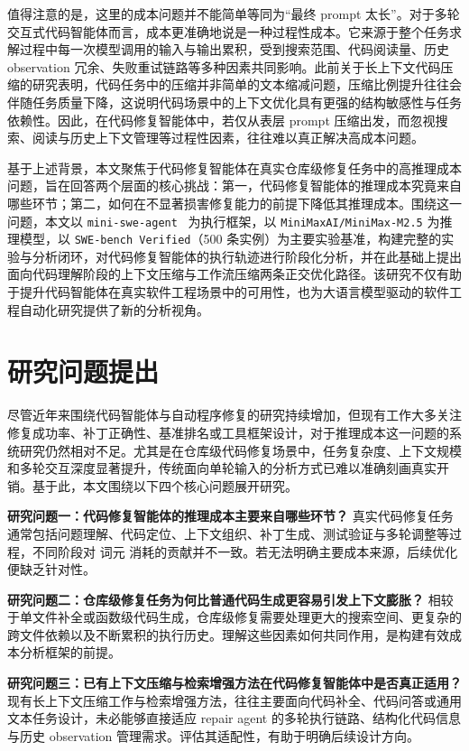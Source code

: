 值得注意的是，这里的成本问题并不能简单等同为“最终 prompt 太长”。对于多轮交互式代码智能体而言，成本更准确地说是一种过程性成本。它来源于整个任务求解过程中每一次模型调用的输入与输出累积，受到搜索范围、代码阅读量、历史 observation 冗余、失败重试链路等多种因素共同影响。此前关于长上下文代码压缩的研究表明，代码任务中的压缩并非简单的文本缩减问题，压缩比例提升往往会伴随任务质量下降，这说明代码场景中的上下文优化具有更强的结构敏感性与任务依赖性。因此，在代码修复智能体中，若仅从表层 prompt 压缩出发，而忽视搜索、阅读与历史上下文管理等过程性因素，往往难以真正解决高成本问题。

基于上述背景，本文聚焦于代码修复智能体在真实仓库级修复任务中的高推理成本问题，旨在回答两个层面的核心挑战：第一，代码修复智能体的推理成本究竟来自哪些环节；第二，如何在不显著损害修复能力的前提下降低其推理成本。围绕这一问题，本文以 \texttt{mini-swe-agent}~\cite{yang2024sweagent} 为执行框架，以 \texttt{MiniMaxAI/MiniMax-M2.5} 为推理模型，以 \texttt{SWE-bench Verified}（500 条实例）为主要实验基准，构建完整的实验与分析闭环，对代码修复智能体的执行轨迹进行阶段化分析，并在此基础上提出面向代码理解阶段的上下文压缩与工作流压缩两条正交优化路径。该研究不仅有助于提升代码智能体在真实软件工程场景中的可用性，也为大语言模型驱动的软件工程自动化研究提供了新的分析视角。


\section{研究问题提出}

尽管近年来围绕代码智能体与自动程序修复的研究持续增加，但现有工作大多关注修复成功率、补丁正确性、基准排名或工具框架设计，对于推理成本这一问题的系统研究仍然相对不足。尤其是在仓库级代码修复场景中，任务复杂度、上下文规模和多轮交互深度显著提升，传统面向单轮输入的分析方式已难以准确刻画真实开销。基于此，本文围绕以下四个核心问题展开研究。

\textbf{研究问题一：代码修复智能体的推理成本主要来自哪些环节？} 真实代码修复任务通常包括问题理解、代码定位、上下文组织、补丁生成、测试验证与多轮调整等过程，不同阶段对 词元 消耗的贡献并不一致。若无法明确主要成本来源，后续优化便缺乏针对性。

\textbf{研究问题二：仓库级修复任务为何比普通代码生成更容易引发上下文膨胀？} 相较于单文件补全或函数级代码生成，仓库级修复需要处理更大的搜索空间、更复杂的跨文件依赖以及不断累积的执行历史。理解这些因素如何共同作用，是构建有效成本分析框架的前提。

\textbf{研究问题三：已有上下文压缩与检索增强方法在代码修复智能体中是否真正适用？} 现有长上下文压缩工作与检索增强方法，往往主要面向代码补全、代码问答或通用文本任务设计，未必能够直接适应 repair agent 的多轮执行链路、结构化代码信息与历史 observation 管理需求。评估其适配性，有助于明确后续设计方向。

